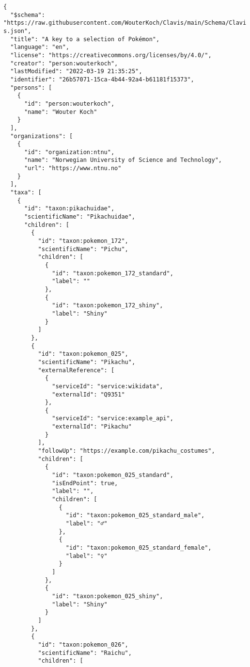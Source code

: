 \documentclass[10pt,letterpaper]{article}
\begin{document}
\vspace*{0.2in}

\begin{flushleft}
{\Large
\textbf{}}
\newline
\end{flushleft}
\linenumbers
\begin{verbatim}
{
  "$schema":
"https://raw.githubusercontent.com/WouterKoch/Clavis/main/Schema/Clavi
s.json",
  "title": "A key to a selection of Pokémon",
  "language": "en",
  "license": "https://creativecommons.org/licenses/by/4.0/",
  "creator": "person:wouterkoch",
  "lastModified": "2022-03-19 21:35:25",
  "identifier": "26b57071-15ca-4b44-92a4-b61181f15373",
  "persons": [
    {
      "id": "person:wouterkoch",
      "name": "Wouter Koch"
    }
  ],
  "organizations": [
    {
      "id": "organization:ntnu",
      "name": "Norwegian University of Science and Technology",
      "url": "https://www.ntnu.no"
    }
  ],
  "taxa": [
    {
      "id": "taxon:pikachuidae",
      "scientificName": "Pikachuidae",
      "children": [
        {
          "id": "taxon:pokemon_172",
          "scientificName": "Pichu",
          "children": [
            {
              "id": "taxon:pokemon_172_standard",
              "label": ""
            },
            {
              "id": "taxon:pokemon_172_shiny",
              "label": "Shiny"
            }
          ]
        },
        {
          "id": "taxon:pokemon_025",
          "scientificName": "Pikachu",
          "externalReference": [
            {
              "serviceId": "service:wikidata",
              "externalId": "Q9351"
            },
            {
              "serviceId": "service:example_api",
              "externalId": "Pikachu"
            }
          ],
          "followUp": "https://example.com/pikachu_costumes",
          "children": [
            {
              "id": "taxon:pokemon_025_standard",
              "isEndPoint": true,
              "label": "",
              "children": [
                {
                  "id": "taxon:pokemon_025_standard_male",
                  "label": "♂"
                },
                {
                  "id": "taxon:pokemon_025_standard_female",
                  "label": "♀"
                }
              ]
            },
            {
              "id": "taxon:pokemon_025_shiny",
              "label": "Shiny"
            }
          ]
        },
        {
          "id": "taxon:pokemon_026",
          "scientificName": "Raichu",
          "children": [

\end{verbatim}
\end{document}
